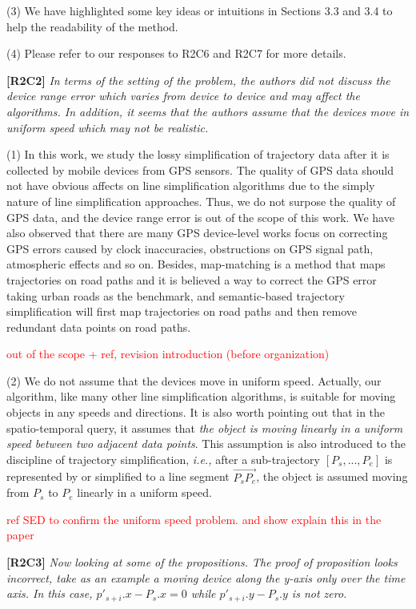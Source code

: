 \documentclass{letter}
\newcommand{\ie}{\emph{i.e.,}\xspace}
\begin{document}
(3) We have highlighted some key ideas or intuitions in Sections 3.3 and 3.4 to help the readability of the method.


(4) Please refer to our responses to R2C6 and R2C7 for more details.

\textbf{[R2C2]} \emph{In terms of the setting of the problem, the authors did not discuss the device range error which varies from device to device and may affect the algorithms.
In addition, it seems that the authors assume that the devices move in uniform speed which may not be realistic.
}

(1) In this work, we study the lossy simplification of trajectory data after it is collected by mobile devices from GPS sensors. The quality of GPS data should not have obvious affects on line simplification algorithms due to the simply nature of line simplification approaches. Thus, we do not surpose the quality of GPS data, and the device range error is out of the scope of this work. 
%
We have also observed that there are many GPS device-level works focus on correcting GPS errors caused by clock inaccuracies, obstructions on GPS signal path, atmospheric effects and so on. Besides, map-matching is a method that maps trajectories on road paths and it is believed a way to correct the GPS error taking urban roads as the benchmark, and semantic-based trajectory simplification will first map trajectories on road paths and then remove redundant data points on road paths.  

\textcolor{red}{out of the scope + ref, revision introduction (before organization)}

(2) We do not assume that the devices move in uniform speed. Actually, our algorithm, like many other line simplification algorithms, is suitable for moving objects in any speeds and directions. It is also worth pointing out that in the spatio-temporal query, it assumes that \textit{the object is moving linearly in a uniform speed between two adjacent data points}. This assumption is also introduced to the discipline of trajectory simplification, \ie after a sub-trajectory $[P_s, ..., P_e]$ is represented by or simplified to a line segment $\overrightarrow{P_sP_e}$, the object is assumed moving from $P_s$ to $P_e$ linearly in a uniform speed.  

\textcolor{red}{ref SED to confirm the uniform speed problem. and show explain this in the paper}

\textbf{[R2C3]} \emph{Now looking at some of the propositions.
The proof of proposition looks incorrect, take as an example a moving device along the y-axis only over the time axis. In this case, $p'_{s+i}.x - P_s.x = 0$ while $p'_{s+i}.y - P_s.y$ is not zero.
}
\end{document}
